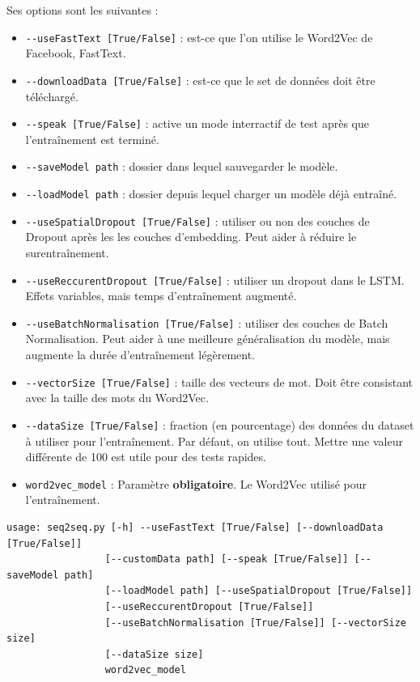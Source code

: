 \documentclass[10pt,a4paper]{article}
\begin{document}
Ses options sont les suivantes :
\begin{itemize}
 \item \texttt{-{}-useFastText [True/False]} : est-ce que l'on utilise le Word2Vec de Facebook, FastText.
 \item \texttt{-{}-downloadData [True/False]} : est-ce que le set de données doit être téléchargé.
 \item \texttt{-{}-speak [True/False]} : active un mode interractif de test après que l'entraînement est terminé.
 \item \texttt{-{}-saveModel path} : dossier dans lequel sauvegarder le modèle.
 \item \texttt{-{}-loadModel path} : dossier depuis lequel charger un modèle déjà entraîné.
 \item \texttt{-{}-useSpatialDropout [True/False]} : utiliser ou non des couches de Dropout après les les couches d'embedding. Peut aider à réduire le surentraînement.
 \item \texttt{-{}-useReccurentDropout [True/False]} : utiliser un dropout dans le LSTM. Effets variables, mais temps d'entraînement augmenté.
 \item \texttt{-{}-useBatchNormalisation [True/False]} : utiliser des couches de Batch Normalisation. Peut aider à une meilleure généralisation du modèle, mais augmente la durée d'entraînement légèrement.
 \item \texttt{-{}-vectorSize [True/False]} : taille des vecteurs de mot. Doit être consistant avec la taille des mots du Word2Vec.
 \item \texttt{-{}-dataSize [True/False]} : fraction (en pourcentage) des données du dataset à utiliser pour l'entraînement. Par défaut, on utilise tout. Mettre une valeur différente de 100 est utile pour des tests rapides.
 \item \texttt{word2vec\_model} : Paramètre \textbf{obligatoire}. Le Word2Vec utilisé pour l'entraînement.
\end{itemize}

\begin{verbatim}
usage: seq2seq.py [-h] --useFastText [True/False] [--downloadData [True/False]]
                 [--customData path] [--speak [True/False]] [--saveModel path]
                 [--loadModel path] [--useSpatialDropout [True/False]]
                 [--useReccurentDropout [True/False]]
                 [--useBatchNormalisation [True/False]] [--vectorSize size]
                 [--dataSize size]
                 word2vec_model
\end{verbatim}
\end{document}
